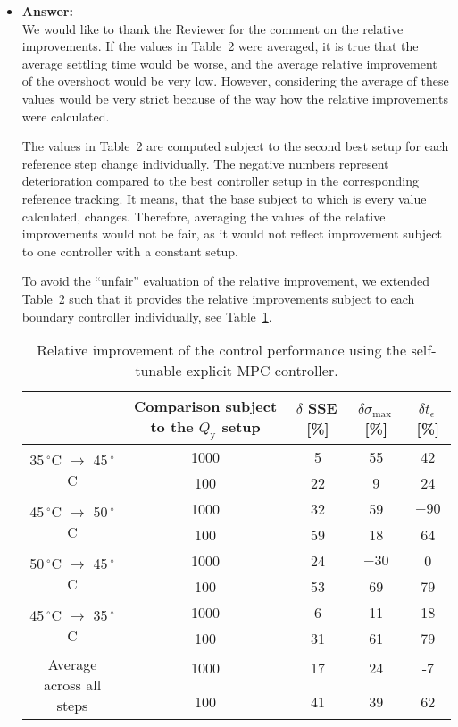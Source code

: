 \documentclass[a4paper,10pt]{article}
\newcommand{\answer}[1]{
	\begin{itemize}
		\item[] \textbf{Answer:}\\ #1
	\end{itemize}
}
\begin{document}
	\answer{
		We would like to thank the Reviewer for the comment on the relative improvements. If the values in Table~2 were averaged, it is true that the average settling time would be worse, and the average relative improvement of the overshoot would be very low. However, considering the average of these values would be very strict because of the way how the relative improvements were calculated.
		
		The values in Table~2 are computed subject to the second best setup for each reference step change individually. The negative numbers represent deterioration compared to the best controller setup in the corresponding reference tracking. It means, that the base subject to which is every value calculated, changes. Therefore, averaging the values of the relative improvements would not be fair, as it would not reflect improvement subject to one controller with a constant setup.
		
		To avoid the ``unfair'' evaluation of the relative improvement, we extended Table~2 such that it provides the relative improvements subject to each boundary controller individually, see Table~\ref{tab:improvement}.
		
		\begin{table}[h!]
			\begin{center}
				\caption{Relative improvement of the control performance using the self-tunable explicit MPC controller.}
				\label{tab:improvement}
				\begin{tabular}{c|c|c|c|c} 
					& Comparison subject to the $Q_\mathrm{y}$ setup & $\delta$ SSE\,[\%] & $\delta \sigma_{\mathrm{max}}$\,[\%] & $\delta t_{\epsilon}$\,[\%]  \\
					\hline
					\multirow{2}{*}{ 35\,$^{\circ}$C $\rightarrow$ 45\,$^{\circ}$C } & 1000 & 5 &  55 & 42 \\
					& 100 & 22 &  9 & 24 \\  
					\hline
					\multirow{2}{*}{45\,$^{\circ}$C $\rightarrow$ 50\,$^{\circ}$C } & 1000 & 32 & 59 &$-90$  \\ 
					& 100 & 59 &  18 & 64 \\ 
					\hline
					\multirow{2}{*}{50\,$^{\circ}$C $\rightarrow$ 45\,$^{\circ}$C } & 1000 & 24 &$-30$& 0 \\ 
					& 100 & 53 & 69 & 79 \\
					\hline
					\multirow{2}{*}{45\,$^{\circ}$C $\rightarrow$ 35\,$^{\circ}$C } &  1000 & 6 & 11 & 18 \\
					& 100 & 31 &  61 & 79 \\
					\hline
					\multirow{2}{*}{Average across all steps} &  1000 & 17 & 24 & -7 \\
					& 100 & 41 &  39 & 62  
				\end{tabular}
			\end{center}
		\end{table}
	
}
\end{document}
